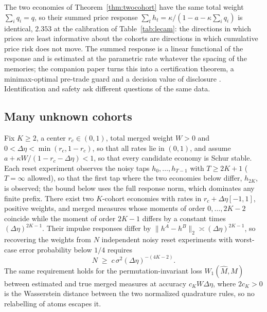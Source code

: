 \begin{remark}\label{rem:riskneutral}
The two economies of Theorem~\ref{thm:twocohort} have the same total weight $\sum_iq_i=q$, so their summed price response $\sum_th_t=\kappa/(1-a-\kappa\sum_iq_i)$ is identical, $2.353$ at the calibration of Table~\ref{tab:lecam}: the directions in which prices are least informative about the cohorts are directions in which cumulative price risk does not move. The summed response is a linear functional of the response and is estimated at the parametric rate whatever the spacing of the memories; the companion paper turns this into a certification theorem, a minimax-optimal pre-trade guard and a decision value of disclosure \citep{niroula2026b}. Identification and safety ask different questions of the same data.
\end{remark}

\subsection{Many unknown cohorts}

\begin{theorem}\label{thm:kcohort}
Fix $K\ge2$, a center $r_c\in(0,1)$, total merged weight $W>0$ and $0<\Delta\eta<\min(r_c,1-r_c)$, so that all rates lie in $(0,1)$, and assume $a+\kappa W/(1-r_c-\Delta\eta)<1$, so that every candidate economy is Schur stable. Each reset experiment observes the noisy taps $h_0,\ldots,h_{T-1}$ with $T\ge2K+1$ ($T=\infty$ allowed), so that the first tap where the two economies below differ, $h_{2K}$, is observed; the bound below uses the full response norm, which dominates any finite prefix. There exist two $K$-cohort economies with rates in $r_c+\Delta\eta[-1,1]$, positive weights, and merged measures whose moments of order $0,\ldots,2K-2$ coincide while the moment of order $2K-1$ differs by a constant times $(\Delta\eta)^{2K-1}$. Their impulse responses differ by $\|h^A-h^B\|_2\asymp(\Delta\eta)^{2K-1}$, so recovering the weights from $N$ independent noisy reset experiments with worst-case error probability below $1/4$ requires
\[
N\;\ge\;c\,\sigma^2(\Delta\eta)^{-(4K-2)} .
\]
The same requirement holds for the permutation-invariant loss $W_1(\hat M,M)$ between estimated and true merged measures at accuracy $c_KW\Delta\eta$, where $2c_K>0$ is the Wasserstein distance between the two normalized quadrature rules, so no relabelling of atoms escapes it.
\end{theorem}

